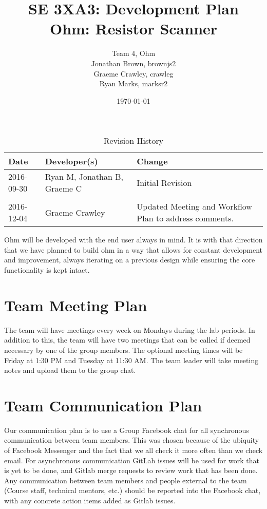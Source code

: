 \documentclass[12pt, titlepage]{article}
\title{SE 3XA3: Development Plan \\Ohm: Resistor Scanner}
\author{Team 4, Ohm
		\\Jonathan Brown, brownjs2
		\\Graeme Crawley, crawleg
		\\Ryan Marks, marksr2
}
\date{\today}
\begin{document}
\begin{table}[hp]
\caption{Revision History} \label{TblRevisionHistory}
\begin{tabularx}{\textwidth}{llX}
\toprule
\textbf{Date} & \textbf{Developer(s)} & \textbf{Change}\\
\midrule
2016-09-30 & Ryan M, Jonathan B, Graeme C & Initial Revision\\ \\
2016-12-04 & Graeme Crawley & Updated Meeting and Workflow Plan to address comments.\\
\bottomrule
\end{tabularx}
\end{table}

\newpage

\maketitle

\newpage

Ohm will be developed with the end user always in mind. It is with that direction that we have planned to build ohm in a way that allows for constant development and improvement, always iterating on a previous design while ensuring the core functionality is kept intact.

\section{Team Meeting Plan}
The team will have meetings every week on Mondays  during the lab periods. In addition to this, the team will have two meetings that can be called if deemed necessary by one of the group members. The optional meeting times will be Friday at 1:30 PM and Tuesday at 11:30 AM. The team leader will take meeting notes and upload them to the group chat.


\section{Team Communication Plan}

Our communication plan is to use a Group Facebook chat for all synchronous communication between team members.
This was chosen because of the ubiquity of Facebook Messenger and the fact that we all check it more often than we check email.
For asynchronous communication GitLab issues will be used for work that is yet to be done, and Gitlab merge requests to review work that has been done.
Any communication between team members and people external to the team (Course staff, technical mentors, etc.) should be reported into the Facebook chat, 
with any concrete action items added as Gitlab issues.
\end{document}
